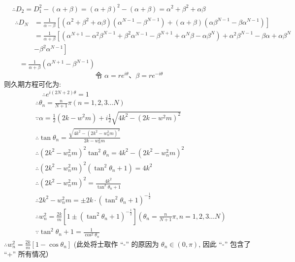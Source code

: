 \documentclass[11pt, a4paper, oneside]{ctexart}
\begin{document}
{{{\begin{appendices}
{$$\begin{aligned}
&\therefore D_{2}=D_{1}^{2}-(\alpha+\beta)=(\alpha+\beta)^{2}-(\alpha+\beta)=\alpha^{2}+\beta^{2}+\alpha \beta \\
&\begin{aligned}
\therefore D_{N} &=\frac{1}{\alpha-\beta}\left[\left(\alpha^{2}+\beta^{2}+\alpha \beta\right)\left(\alpha^{N-1}-\beta^{N-1}\right)+(\alpha+\beta)\left(\alpha \beta^{N-1}-\beta \alpha^{N-1}\right)\right] \\
&=\frac{1}{\alpha+\beta}\left[\left(\alpha^{N+1}-\alpha^{2} \beta^{N-1}+\beta^{2} \alpha^{N-1}-\beta^{N+1}+\alpha^{N} \beta-\alpha \beta^{N}\right)+\alpha^{2} \beta^{N-1}-\beta \alpha+\alpha \beta^{N}\right.\\
&\left.-\beta^{2} \alpha^{N-1}\right]
\end{aligned} \\
&\quad=\frac{1}{\alpha+\beta}\left(\alpha^{N+1}-\beta^{N-1}\right)
\end{aligned}
$$
$$
\text { 令 } \alpha=r e^{i \theta} 、 \beta=r e^{-i \theta}
$$
则久期方程可化为:
$$
\begin{aligned}
&\quad \therefore e^{i(2 N+2) \theta}=1 \\
&\therefore \theta_{n}=\frac{n}{N+1} \pi(n=1,2,3 \ldots N) \\
&\because \alpha=\frac{1}{2}\left(2 k-w^{2} m\right)+i \frac{1}{2} \sqrt{4 k^{2}-\left(2 k-w^{2} m\right)^{2}} \\
&\therefore \tan \theta_{n}=\frac{\sqrt{4 k^{2}-\left(2 k^{2}-w_{n}^{2} m\right)^{2}}}{2 k-w_{n}^{2} m} \\
&\therefore\left(2 k^{2}-w_{n}^{2} m\right)^{2} \tan ^{2} \theta_{n}=4 k^{2}-\left(2 k^{2}-w_{n}^{2} m\right)^{2} \\
&\therefore\left(2 k^{2}-w_{n}^{2} m\right)^{2}\left(\tan ^{2} \theta_{n}+1\right)=4 k^{2} \\
&\therefore\left(2 k^{2}-w_{n}^{2} m\right)^{2}=\frac{4 k^{2}}{\tan ^{2} \theta_{n}+1} \\
&\therefore 2 k^{2}-w_{n}^{2} m=\pm 2 k \cdot\left(\tan ^{2} \theta_{n}+1\right)^{-\frac{1}{2}} \\
&\therefore w_{n}^{2}=\frac{2 k}{m}\left[1 \pm\left(\tan ^{2} \theta_{n}+1\right)^{-\frac{1}{2}}\right]\left(\theta_{n}=\frac{n}{N+1} \pi, n=1,2,3 \ldots N\right) \\
&\because \tan ^{2} \theta_{n}+1=\frac{1}{\cos ^{2} \theta_{n}}
\end{aligned}
$$
$\therefore w_{n}^{2}=\frac{2 k}{m}\left[1-\cos \theta_{n}\right]$ (此处将士取作 “-” 的原因为 $\theta_{n} \in(0, \pi)$, 因此 “-” 包含了 “+” 所有情况）
}
\end{appendices}}}}
\end{document}
